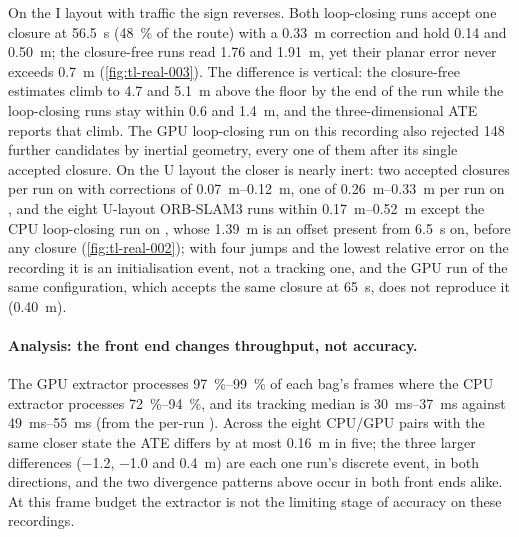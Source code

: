 \documentclass[11pt,a4paper,notitlepage]{report}
\begin{document}
On the I layout with traffic the sign reverses. Both loop-closing runs accept
one closure at \SI{56.5}{\second} (\SI{48}{\percent} of the route) with a
\SI{0.33}{\metre} correction and hold \SI{0.14}{} and \SI{0.50}{\metre}; the
closure-free runs read \SI{1.76}{} and \SI{1.91}{\metre}, yet their planar
error never exceeds \SI{0.7}{\metre} (\cref{fig:tl-real-003}). The difference
is vertical: the closure-free estimates climb to \SI{4.7}{} and
\SI{5.1}{\metre} above the floor by the end of the run while the loop-closing
runs stay within \SI{0.6}{} and \SI{1.4}{\metre}, and the three-dimensional
ATE reports that climb. The GPU loop-closing run on this recording also
rejected 148 further candidates by inertial geometry, every one of them after
its single accepted closure. On the U layout the closer is nearly inert: two
accepted closures per run on  with corrections of
\SIrange{0.07}{0.12}{\metre}, one of \SIrange{0.26}{0.33}{\metre} per run on
, and the eight U-layout ORB-SLAM3 runs within
\SIrange{0.17}{0.52}{\metre} except the CPU loop-closing run on
, whose \SI{1.39}{\metre} is an offset present from
\SI{6.5}{\second} on, before any closure (\cref{fig:tl-real-002}); with four
jumps and the lowest relative error on the recording it is an initialisation
event, not a tracking one, and the GPU run of the same configuration, which
accepts the same closure at \SI{65}{\second}, does not reproduce it
(\SI{0.40}{\metre}).

\paragraph{Analysis: the front end changes throughput, not accuracy.} The GPU
extractor processes \SIrange{97}{99}{\percent} of each bag's frames where the
CPU extractor processes \SIrange{72}{94}{\percent}, and its tracking median
is \SIrange{30}{37}{\milli\second} against \SIrange{49}{55}{\milli\second}
(from the per-run ). Across the eight CPU/GPU pairs
with the same closer state the ATE differs by at most \SI{0.16}{\metre} in
five; the three larger differences (\SI{-1.2}{}, \SI{-1.0}{} and
\SI{+0.4}{\metre}) are each one run's discrete event, in both directions,
and the two divergence patterns above occur in both front ends alike. At this frame budget the extractor is not the limiting
stage of accuracy on these recordings.
\end{document}
